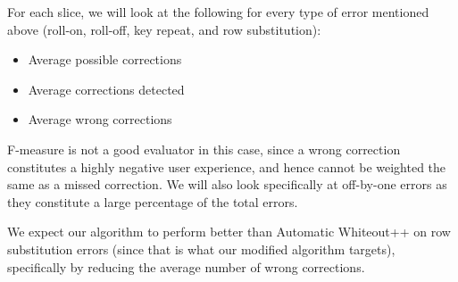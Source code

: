 \documentclass[letterpaper, 9 pt, conference]{ieeeconf}  %
\begin{document}
For each slice, we will look at the following for every type of error mentioned above (roll-on, roll-off, key repeat, and row substitution):
\begin{itemize}
\item Average possible corrections
\item Average corrections detected
\item Average wrong corrections
\end{itemize}

F-measure is not a good evaluator in this case, since a wrong correction constitutes a highly negative user experience, and hence cannot be weighted the same as a missed correction.  
We will also look specifically at off-by-one errors as they constitute a large percentage of the total errors.

We expect our algorithm to perform better than Automatic Whiteout++ on row substitution errors (since that is what our modified algorithm targets), specifically by reducing the average number of wrong corrections.



\end{document}
